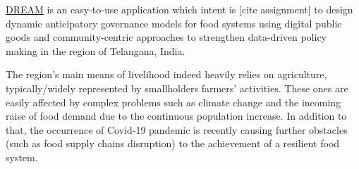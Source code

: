 

\hyperref[tab:acronymsTable]{DREAM} is an easy-to-use application which intent is [cite assignment] to design dynamic anticipatory governance models for food systems using digital public goods and community-centric approaches to strengthen data-driven policy making in the region of Telangana, India.

The region's main means of livelihood indeed heavily relies on agriculture, typically/widely represented by smallholders farmers' activities. These ones are easily affected by complex problems such as climate change and the incoming raise of food demand due to the continuous population increase. In addition to that, the occurrence of Covid-19 pandemic is recently causing further obstacles (such as food supply chains disruption) to the achievement of a resilient food system.

